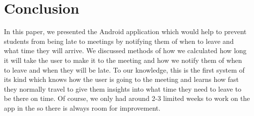 \section{Conclusion}
In this paper, we presented the  Android application which would help to prevent students from being late to meetings by notifying them of when to leave and what time they will arrive. We discussed methods of how we calculated how long it will take the user to make it to the meeting and how we notify them of when to leave and when they will be late. To our knowledge, this is the first system of its kind which knows how the user is going to the meeting and learns how fast they normally travel to give them insights into what time they need to leave to be there on time. Of course, we only had around 2-3 limited weeks to work on the app in the so there is always room for improvement.
